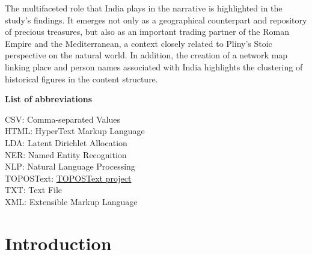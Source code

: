 \documentclass[
  12pt,
]{article}
\renewcommand*\contentsname{Table of contents}
\newcommand\contentsname{Table of contents}
\begin{document}
The multifaceted role that India plays in the narrative is highlighted in the study's findings. It emerges not only as a geographical counterpart and repository of precious treasures, but also as an important trading partner of the Roman Empire and the Mediterranean, a context closely related to Pliny's Stoic perspective on the natural world. In addition, the creation of a network map linking place and person names associated with India highlights the clustering of historical figures in the content structure.

\newpage


\raggedright

\Large\textbf{List of abbreviations}   

\vspace*{\baselineskip}
\normalsize
CSV: Comma-separated Values\\
\medskip
HTML: HyperText Markup Language\\
\medskip
LDA: Latent Dirichlet Allocation\\
\medskip
NER: Named Entity Recognition\\
\medskip
NLP: Natural Language Processing \\
\medskip
TOPOSText: \href{https://topostext.org/}{TOPOSText project} \\
\medskip
TXT: Text File\\
\medskip
XML: Extensible Markup Language\\

\newpage

\normalsize
\justifying\ifdefined\Shaded\renewenvironment{Shaded}{\begin{tcolorbox}[interior hidden, sharp corners, borderline west={3pt}{0pt}{shadecolor}, boxrule=0pt, breakable, enhanced, frame hidden]}{\end{tcolorbox}}\fi

\renewcommand*\contentsname{Table of Contents}
{
\hypersetup{linkcolor=}
\setcounter{tocdepth}{3}
\tableofcontents
}
\clearpage
\listoffigures
\listoftables
{}
\clearpage
\pagestyle{plain}
\setcounter{page}{1}

\hypertarget{sec-introduction}{%
\section{Introduction}\label{sec-introduction}}
\end{document}
